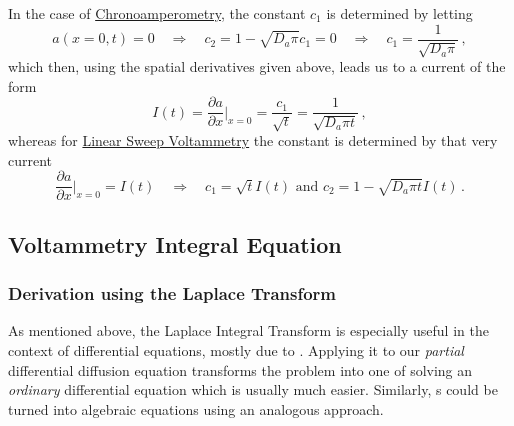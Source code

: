 \documentclass{prettytex/ox/mmsc-special-topic}
\begin{document}
  In the case of \underline{Chronoamperometry}, the constant $c_1$ is determined by letting
  $$a(x=0, t) = 0 \quad\Rightarrow\quad c_2 = 1 - \sqrt{D_a\pi} c_1 = 0 \quad\Rightarrow\quad c_1 = \frac{1}{\sqrt{D_a \pi}}\,,$$
  which then, using the spatial derivatives given above, leads us to a current of the form
  \begin{equation*}
    I(t) = \frac{\partial a}{\partial x}\bigg|_{x=0} = \frac{c_1}{\sqrt{t}} = \frac{1}{\sqrt{D_a \pi t}}\,,
  \end{equation*}
  whereas for \underline{Linear Sweep Voltammetry} the constant is determined by that very current
  $$\frac{\partial a}{\partial x}\bigg|_{x=0} = I(t) \quad\Rightarrow\quad c_1 = \sqrt{t} I(t) \text{ and } c_2 = 1 - \sqrt{D_a \pi t} I(t)\,.$$

  \subsection{Voltammetry Integral Equation}
  \subsubsection{Derivation using the Laplace Transform}
  As mentioned above, the Laplace Integral Transform is especially useful in the context of differential equations, mostly due to .
  Applying it to our \textit{partial} differential diffusion equation  transforms the problem into one of solving an \textit{ordinary} differential equation which is usually much easier.
  Similarly, s could be turned into algebraic equations using an analogous approach.
\end{document}
